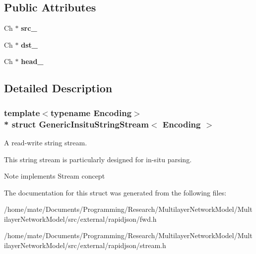 \subsection*{Public Attributes}
\begin{DoxyCompactItemize}
\item 
Ch $\ast$ {\bfseries src\+\_\+}\hypertarget{structGenericInsituStringStream_af3cc551dd07fcca39db84459f4d4e718}{}\label{structGenericInsituStringStream_af3cc551dd07fcca39db84459f4d4e718}

\item 
Ch $\ast$ {\bfseries dst\+\_\+}\hypertarget{structGenericInsituStringStream_ab0e7a73638a7a8db81aa9b26714b0e3b}{}\label{structGenericInsituStringStream_ab0e7a73638a7a8db81aa9b26714b0e3b}

\item 
Ch $\ast$ {\bfseries head\+\_\+}\hypertarget{structGenericInsituStringStream_af5a7116bdd9bfde5141c298a5b7566b0}{}\label{structGenericInsituStringStream_af5a7116bdd9bfde5141c298a5b7566b0}

\end{DoxyCompactItemize}


\subsection{Detailed Description}
\subsubsection*{template$<$typename Encoding$>$\\*
struct Generic\+Insitu\+String\+Stream$<$ Encoding $>$}

A read-\/write string stream. 

This string stream is particularly designed for in-\/situ parsing. \begin{DoxyNote}{Note}
implements Stream concept 
\end{DoxyNote}


The documentation for this struct was generated from the following files\+:\begin{DoxyCompactItemize}
\item 
/home/mate/\+Documents/\+Programming/\+Research/\+Multilayer\+Network\+Model/\+Multilayer\+Network\+Model/src/external/rapidjson/fwd.\+h\item 
/home/mate/\+Documents/\+Programming/\+Research/\+Multilayer\+Network\+Model/\+Multilayer\+Network\+Model/src/external/rapidjson/stream.\+h\end{DoxyCompactItemize}
